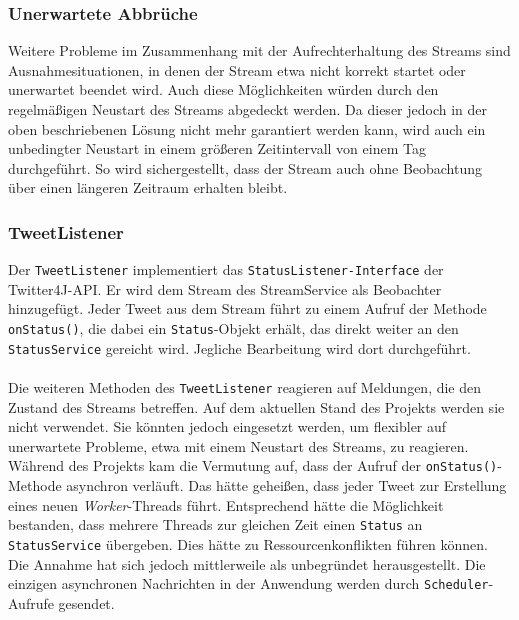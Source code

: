 \subsubsection*{Unerwartete Abbrüche}
Weitere Probleme im Zusammenhang mit der Aufrechterhaltung des Streams sind Ausnahmesituationen, in denen der Stream etwa nicht korrekt startet oder unerwartet beendet wird. Auch diese Möglichkeiten würden durch den regelmäßigen Neustart des Streams abgedeckt werden. Da dieser jedoch in der oben beschriebenen Lösung nicht mehr garantiert werden kann, wird auch ein unbedingter Neustart in einem größeren Zeitintervall von einem Tag durchgeführt. So wird sichergestellt, dass der Stream auch ohne Beobachtung über einen längeren Zeitraum erhalten bleibt.
%
\subsubsection*{TweetListener}
Der \texttt{TweetListener} implementiert das \texttt{StatusListener-Interface} der Twitter4J-API. Er 
wird dem Stream des StreamService als Beobachter hinzugefügt. Jeder Tweet aus dem Stream führt zu 
einem Aufruf der Methode \texttt{onStatus()}, die dabei ein \texttt{Status}-Objekt erhält, das direkt weiter an den 
\texttt{StatusService} gereicht wird. Jegliche Bearbeitung wird dort durchgeführt. \\\\
Die weiteren Methoden des \texttt{TweetListener} reagieren auf Meldungen, die den Zustand des Streams 
betreffen. Auf dem aktuellen Stand des Projekts werden sie nicht verwendet. Sie könnten jedoch 
eingesetzt werden, um flexibler auf unerwartete Probleme, etwa mit einem Neustart des Streams, zu 
reagieren. \\
Während des Projekts kam die Vermutung auf, dass der Aufruf der \texttt{onStatus()}-Methode asynchron verläuft. Das hätte geheißen, dass jeder Tweet zur Erstellung eines neuen \textit{Worker}-Threads führt. Entsprechend hätte die Möglichkeit bestanden, dass mehrere Threads zur gleichen Zeit einen \texttt{Status} an \texttt{StatusService} übergeben. Dies hätte zu Ressourcenkonflikten führen können. Die Annahme hat sich jedoch mittlerweile als unbegründet herausgestellt. Die einzigen asynchronen Nachrichten in der Anwendung werden durch \texttt{Scheduler}-Aufrufe gesendet.
%
